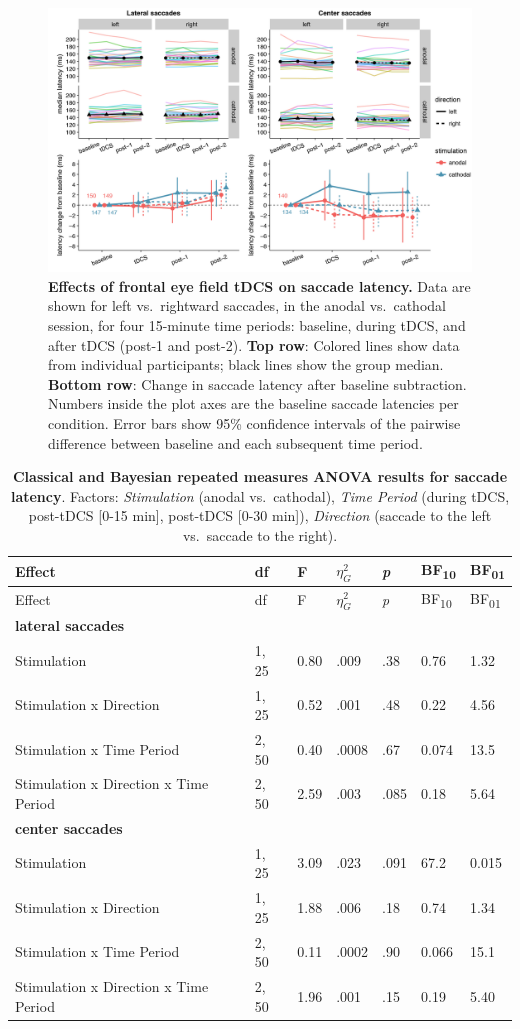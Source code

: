 \documentclass[11pt,english,]{memoir}
\begin{document}
\begin{figure}
\includegraphics[width=130mm]{sacc_tDCS_files/figures/figure_4_latency} \caption{\textbf{Effects of frontal eye field tDCS on saccade latency.} Data are shown for left vs.~rightward saccades, in the anodal vs.~cathodal session, for four 15-minute time periods: baseline, during tDCS, and after tDCS (post-1 and post-2). \textbf{Top row}: Colored lines show data from individual participants; black lines show the group median. \textbf{Bottom row}: Change in saccade latency after baseline subtraction. Numbers inside the plot axes are the baseline saccade latencies per condition. Error bars show 95\% confidence intervals of the pairwise difference between baseline and each subsequent time period.}\label{fig:fig-latency}
\end{figure}



\begingroup
\setlength{\LTleft}{-20cm plus -1fill}
\setlength{\LTright}{\LTleft}
\small

\begin{longtable}[]{@{}lllllll@{}}
\caption{\label{tab:tab-latency} \textbf{Classical and Bayesian repeated measures ANOVA results for saccade latency}. Factors: \emph{Stimulation} (anodal vs.~cathodal), \emph{Time Period} (during tDCS, post-tDCS {[}0-15 min{]}, post-tDCS {[}0-30 min{]}), \emph{Direction} (saccade to the left vs.~saccade to the right).}\tabularnewline
\toprule
Effect & df & F & \(\eta_{G}^{2}\) & \emph{p} & BF\textsubscript{10} & BF\textsubscript{01}\tabularnewline
\midrule
\endfirsthead
\toprule
Effect & df & F & \(\eta_{G}^{2}\) & \emph{p} & BF\textsubscript{10} & BF\textsubscript{01}\tabularnewline
\midrule
\endhead
\textbf{lateral saccades} & & & & & &\tabularnewline
Stimulation & 1, 25 & 0.80 & .009 & .38 & 0.76 & 1.32\tabularnewline
Stimulation x Direction & 1, 25 & 0.52 & .001 & .48 & 0.22 & 4.56\tabularnewline
Stimulation x Time Period & 2, 50 & 0.40 & .0008 & .67 & 0.074 & 13.5\tabularnewline
Stimulation x Direction x Time Period & 2, 50 & 2.59 & .003 & .085 & 0.18 & 5.64\tabularnewline
\textbf{center saccades} & & & & & &\tabularnewline
Stimulation & 1, 25 & 3.09 & .023 & .091 & 67.2 & 0.015\tabularnewline
Stimulation x Direction & 1, 25 & 1.88 & .006 & .18 & 0.74 & 1.34\tabularnewline
Stimulation x Time Period & 2, 50 & 0.11 & .0002 & .90 & 0.066 & 15.1\tabularnewline
Stimulation x Direction x Time Period & 2, 50 & 1.96 & .001 & .15 & 0.19 & 5.40\tabularnewline
\bottomrule
\end{longtable}
\end{document}
